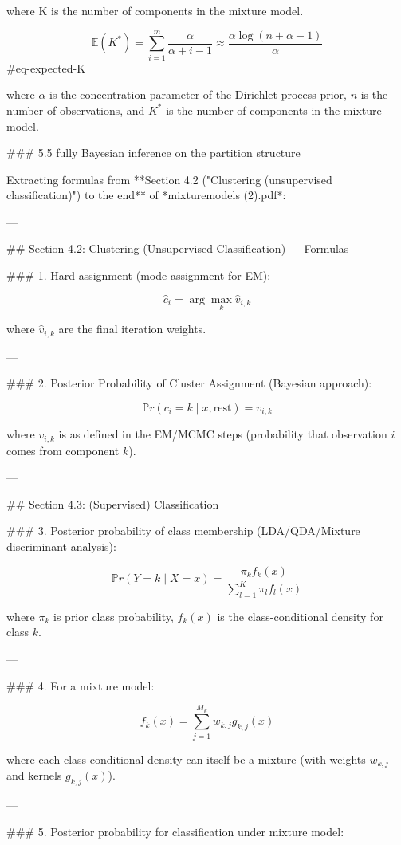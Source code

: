 where K is the number of components in the mixture model.

$$
\mathbb{E}(K^*)=\sum_{i=1}^m \frac{\alpha}{\alpha + i - 1} \approx \frac{\alpha \log(n + \alpha -1) }{\alpha}
$$ {#eq-expected-K}

where $\alpha$ is the concentration parameter of the Dirichlet process prior, $n$ is the number of observations, and $K^*$ is the number of components in the mixture model.

### 5.5 fully Bayesian inference on the partition structure



Extracting formulas from **Section 4.2 ("Clustering (unsupervised classification)") to the end** of *mixturemodels (2).pdf*:

---

## Section 4.2: Clustering (Unsupervised Classification) — Formulas

### 1. Hard assignment (mode assignment for EM):

$$
\hat{c}_i = \arg\max_k \hat{v}_{i,k}
$$

where $\hat{v}_{i,k}$ are the final iteration weights.

---

### 2. Posterior Probability of Cluster Assignment (Bayesian approach):

$$
\mathbb{P}r(c_i = k \mid x, \text{rest}) = v_{i,k}
$$

where $v_{i,k}$ is as defined in the EM/MCMC steps (probability that observation $i$ comes from component $k$).

---

## Section 4.3: (Supervised) Classification

### 3. Posterior probability of class membership (LDA/QDA/Mixture discriminant analysis):

$$
\mathbb{P}r(Y = k \mid X = x) = \frac{\pi_k f_k(x)}{\sum_{l=1}^K \pi_l f_l(x)}
$$

where $\pi_k$ is prior class probability, $f_k(x)$ is the class-conditional density for class $k$.

---

### 4. For a mixture model:

$$
f_k(x) = \sum_{j=1}^{M_k} w_{k,j} g_{k,j}(x)
$$

where each class-conditional density can itself be a mixture (with weights $w_{k,j}$ and kernels $g_{k,j}(x)$).

---

### 5. Posterior probability for classification under mixture model:

